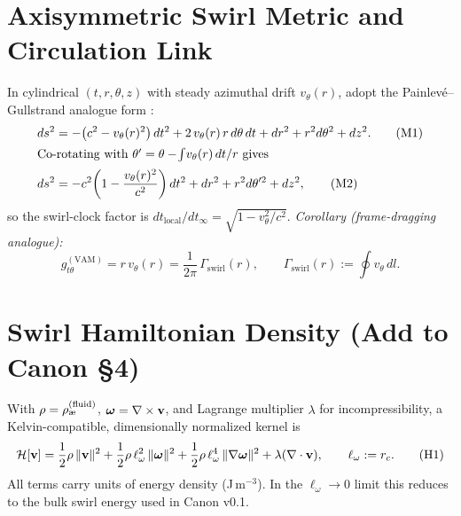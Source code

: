 \documentclass[11pt]{article}
\begin{document}
    \section{Axisymmetric Swirl Metric and Circulation Link}
    \label{sec:metric}
    In cylindrical \((t,r,\theta,z)\) with steady azimuthal drift \(v_\theta(r)\), adopt the Painlevé–Gullstrand analogue form \cite{Unruh1981,Visser1998,Painleve1921,Gullstrand1922}:
    \begin{align}
        ds^2 &= -\big(c^2 - v_\theta(r)^2\big)\,dt^2 + 2\,v_\theta(r)\,r\, d\theta\, dt + dr^2 + r^2 d\theta^2 + dz^2. \tag{M1}\label{eq:pg} \\
        \intertext{Co-rotating with \(\theta'=\theta-\!\int \! v_\theta(r)\,dt/r\) gives}
        ds^2 &= -c^2\!\left(1-\frac{v_\theta(r)^2}{c^2}\right)dt^2 + dr^2 + r^2 d\theta'^2 + dz^2, \tag{M2}
    \end{align}
    so the swirl-clock factor is \(dt_{\text{local}}/dt_\infty=\sqrt{1-v_\theta^2/c^2}\). \emph{Corollary (frame-dragging analogue):}
    \begin{equation}
        g^{(\mathrm{VAM})}_{t\theta} = r\,v_\theta(r) = \frac{1}{2\pi}\,\Gamma_{\text{swirl}}(r),\qquad \Gamma_{\text{swirl}}(r):=\oint v_\theta\, dl. \tag{M3}\label{eq:gtth}
    \end{equation}

    \section{Swirl Hamiltonian Density (Add to Canon \S4)}
    \label{sec:hamiltonian}
    With \(\rho=\aeFluid\), \(\bm{\omega}=\nabla\times \vb v\), and Lagrange multiplier \(\lambda\) for incompressibility, a Kelvin-compatible, dimensionally normalized kernel is
    \begin{equation}
        \mathcal{H}[\vb v] = \frac{1}{2}\rho\,\|\vb v\|^2 + \frac{1}{2}\rho\,\ell_\omega^2\,\|\bm{\omega}\|^2 + \frac{1}{2}\rho\,\ell_\omega^4\,\|\nabla \bm{\omega}\|^2 + \lambda (\nabla\cdot \vb v),\qquad \ell_\omega:=r_c. \tag{H1}\label{eq:Hamiltonian}
    \end{equation}
    All terms carry units of energy density (J\,m\(^{-3}\)). In the \(\ell_\omega\to 0\) limit this reduces to the bulk swirl energy used in Canon v0.1.
\end{document}
